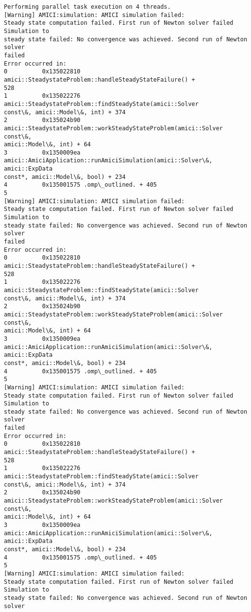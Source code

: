 \documentclass[11pt]{article}
\begin{document}
    \begin{Verbatim}[commandchars=\\\{\}]
Performing parallel task execution on 4 threads.
[Warning] AMICI:simulation: AMICI simulation failed:
Steady state computation failed. First run of Newton solver failed Simulation to
steady state failed: No convergence was achieved. Second run of Newton solver
failed
Error occurred in:
0          0x135022810 amici::SteadystateProblem::handleSteadyStateFailure() +
528
1          0x135022276 amici::SteadystateProblem::findSteadyState(amici::Solver
const\&, amici::Model\&, int) + 374
2          0x135024b90
amici::SteadystateProblem::workSteadyStateProblem(amici::Solver const\&,
amici::Model\&, int) + 64
3          0x1350009ea
amici::AmiciApplication::runAmiciSimulation(amici::Solver\&, amici::ExpData
const*, amici::Model\&, bool) + 234
4          0x135001575 .omp\_outlined. + 405
5
[Warning] AMICI:simulation: AMICI simulation failed:
Steady state computation failed. First run of Newton solver failed Simulation to
steady state failed: No convergence was achieved. Second run of Newton solver
failed
Error occurred in:
0          0x135022810 amici::SteadystateProblem::handleSteadyStateFailure() +
528
1          0x135022276 amici::SteadystateProblem::findSteadyState(amici::Solver
const\&, amici::Model\&, int) + 374
2          0x135024b90
amici::SteadystateProblem::workSteadyStateProblem(amici::Solver const\&,
amici::Model\&, int) + 64
3          0x1350009ea
amici::AmiciApplication::runAmiciSimulation(amici::Solver\&, amici::ExpData
const*, amici::Model\&, bool) + 234
4          0x135001575 .omp\_outlined. + 405
5
[Warning] AMICI:simulation: AMICI simulation failed:
Steady state computation failed. First run of Newton solver failed Simulation to
steady state failed: No convergence was achieved. Second run of Newton solver
failed
Error occurred in:
0          0x135022810 amici::SteadystateProblem::handleSteadyStateFailure() +
528
1          0x135022276 amici::SteadystateProblem::findSteadyState(amici::Solver
const\&, amici::Model\&, int) + 374
2          0x135024b90
amici::SteadystateProblem::workSteadyStateProblem(amici::Solver const\&,
amici::Model\&, int) + 64
3          0x1350009ea
amici::AmiciApplication::runAmiciSimulation(amici::Solver\&, amici::ExpData
const*, amici::Model\&, bool) + 234
4          0x135001575 .omp\_outlined. + 405
5
[Warning] AMICI:simulation: AMICI simulation failed:
Steady state computation failed. First run of Newton solver failed Simulation to
steady state failed: No convergence was achieved. Second run of Newton solver

\end{Verbatim}
\end{document}
